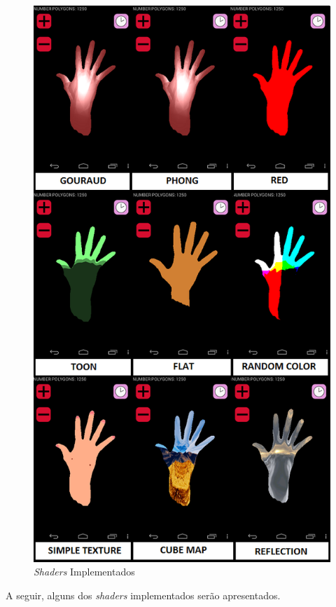 	\begin{figure}[ht]
	\centering
		\includegraphics[keepaspectratio=true,scale=0.7]{figuras/shaders_impl.png}
	\caption{\textit{Shaders} Implementados}
	\label{shaders_impl}
	\end{figure}

	A seguir, alguns dos \textit{shaders} implementados serão apresentados.

